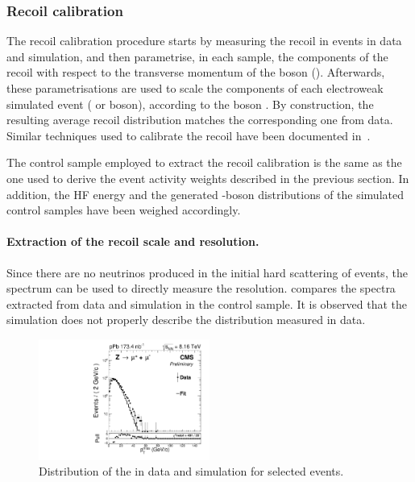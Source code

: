 \subsubsection{Recoil calibration} \label{sec:WBoson_Analysis_Corrections_RecoilCalib}

The recoil calibration procedure starts by measuring the recoil in \ZToMuMu events in data and simulation, and then parametrise, in each sample, the components of the recoil \utvec with respect to the transverse momentum of the \Z boson (\qtZ). Afterwards, these parametrisations are used to scale the \utvec components of each electroweak simulated event ({\PW} or {\PZ} boson), according to the boson \pt. By construction, the resulting average recoil distribution matches the corresponding one from data. Similar techniques used to calibrate the recoil have been documented in~\cite{MET_Reco,MET_Reco_2,RecoilCalibration}.

The \ZToMuMu control sample employed to extract the recoil calibration is the same as the one used to derive the event activity weights described in the previous section. In addition, the HF energy and the generated \Z-boson \pt distributions of the simulated control samples have been weighed accordingly.

\paragraph{Extraction of the recoil scale and resolution.} Since there are no neutrinos produced in the initial hard scattering of \ZToMuMu events, the \ptmiss spectrum can be used to directly measure the \ptmiss resolution.  compares the \ptmiss spectra extracted from data and simulation in the \ZToMuMu control sample. It is observed that the simulation does not properly describe the \ptmiss distribution measured in data.

\begin{figure}[htb!]
 \centering
 \includegraphics[width=0.5\textwidth]{Figures/WBoson/Analysis/Correction/Recoil/CheckFits/Z/METPF_RAW/PLOT_MET_DATA_ZToMuPl_PA_Model_TEMP_DY_MuEtaCM_-286_193_MuIso_0_15.pdf}
 \caption{Distribution of the \ptmiss in data and simulation for \ZToMuMu selected events.}
 \label{fig:METZBoson}
\end{figure}

